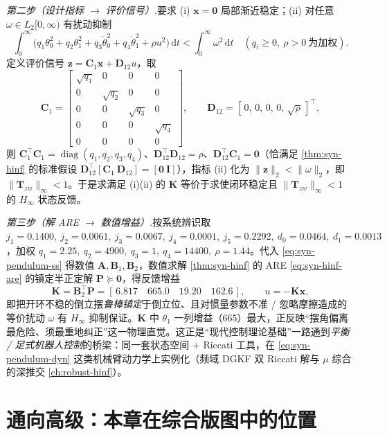 \begin{example}
\emph{第二步（设计指标 $\to$ 评价信号）.}\;要求 (i) $\mathbf x=\mathbf 0$ 局部渐近稳定；(ii) 对任意 $\omega\in L_2[0,\infty)$ 有扰动抑制
\[
  \int_0^\infty\!\big(q_1\theta_0^2+q_2\theta_1^2+q_3\dot\theta_0^2+q_4\dot\theta_1^2+\rho u^2\big)\,\mathrm dt<\int_0^\infty\!\omega^2\,\mathrm dt\quad(q_i\ge0,\ \rho>0\ \text{为加权}).
\]
定义评价信号 $\mathbf z=\mathbf C_1\mathbf x+\mathbf D_{12}u$，取
\[
  \mathbf C_1=\begin{bmatrix}\sqrt{q_1}&0&0&0\\0&\sqrt{q_2}&0&0\\0&0&\sqrt{q_3}&0\\0&0&0&\sqrt{q_4}\\0&0&0&0\end{bmatrix},\qquad
  \mathbf D_{12}=[\,0,\,0,\,0,\,0,\,\sqrt\rho\,]^\top,
\]
则 $\mathbf C_1^\top\mathbf C_1=\operatorname{diag}(q_1,q_2,q_3,q_4)$、$\mathbf D_{12}^\top\mathbf D_{12}=\rho$、$\mathbf D_{12}^\top\mathbf C_1=\mathbf 0$（恰满足 \cref{thm:syn-hinf} 的标准假设 $\mathbf D_{12}^\top[\mathbf C_1\ \mathbf D_{12}]=[\mathbf 0\ \mathbf I]$），指标 (ii) 化为 $\|\mathbf z\|_2<\|\omega\|_2$，即 $\|\mathbf T_{zw}\|_\infty<1$。于是求满足 (i)(ii) 的 $\mathbf K$ 等价于求使闭环稳定且 $\|\mathbf T_{zw}\|_\infty<1$ 的 $H_\infty$ 状态反馈。

\emph{第三步（解 ARE $\to$ 数值增益）.}\;按系统辨识取 $j_1=0.1400,\ j_2=0.0061,\ j_3=0.0067,\ j_4=0.0001,\ j_5=0.2292,\ d_0=0.0464,\ d_1=0.0013$，加权 $q_1=2.25,\ q_2=4900,\ q_3=1,\ q_4=14400,\ \rho=1.44$。代入 \cref{eq:syn-pendulum-ss} 得数值 $\mathbf A,\mathbf B_1,\mathbf B_2$，数值求解 \cref{thm:syn-hinf} 的 ARE \cref{eq:syn-hinf-are} 的镇定半正定解 $\mathbf P\succeq\mathbf 0$，得反馈增益
\begin{equation}
  \mathbf K=\mathbf B_2^\top\mathbf P=[\,6.817\quad 665.0\quad 19.20\quad 162.6\,],\qquad u=-\mathbf K\mathbf x,
  \label{eq:syn-pendulum-K}
\end{equation}
即把开环不稳的倒立摆\emph{鲁棒镇定}于倒立位、且对惯量参数不准 / 忽略摩擦造成的等价扰动 $\omega$ 有 $H_\infty$ 抑制保证。$\mathbf K$ 中 $\theta_1$ 一列增益（$665$）最大，正反映“摆角偏离最危险、须最重地纠正”这一物理直觉。这正是“现代控制理论基础”一路通到\emph{平衡 / 足式机器人控制}的桥梁：同一套状态空间 $+$ Riccati 工具，在 \cref{eq:syn-pendulum-dyn} 这类机械臂动力学上实例化（频域 DGKF 双 Riccati 解与 $\mu$ 综合的深推交 \cref{ch:robust-hinf}）。
\end{example}

\section{通向高级：本章在综合版图中的位置}
\label{sec:syn-outlook}

